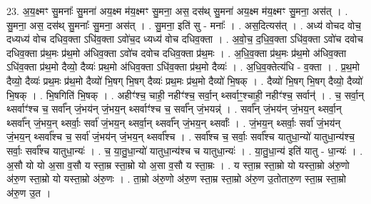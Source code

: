 \documentclass[17pt]{extarticle}
\begin{document}
23. अ॒य॒क्ष्मꣳ सु॒मनाः᳚ सु॒मना॑ अय॒क्ष्म म॑य॒क्ष्मꣳ सु॒मना॒ अस॒ दस॑थ् सु॒मना॑ अय॒क्ष्म म॑य॒क्ष्मꣳ सु॒मना॒ अस॑त् । . सु॒मना॒ अस॒ दस॑थ् सु॒मनाः᳚ सु॒मना॒ अस॑त् । . सु॒मना॒ इति॑ सु - मनाः᳚ । . अस॒दित्यस॑त् । . अध्य॑ वोचद वोच॒ दध्यध्य॑ वोच दधिव॒क्ता ऽधि॑व॒क्ता ऽवो॑च॒द ध्यध्य॑ वोच दधिव॒क्ता । . अ॒वो॒च॒ द॒धि॒व॒क्ता ऽधि॑व॒क्ता ऽवो॑च दवोच दधिव॒क्ता प्र॑थ॒मः प्र॑थ॒मो अ॑धिव॒क्ता ऽवो॑च दवोच दधिव॒क्ता प्र॑थ॒मः । . अ॒धि॒व॒क्ता प्र॑थ॒मः प्र॑थ॒मो अ॑धिव॒क्ता ऽधि॑व॒क्ता प्र॑थ॒मो दैव्यो॒ दैव्यः॑ प्रथ॒मो अ॑धिव॒क्ता ऽधि॑व॒क्ता प्र॑थ॒मो दैव्यः॑ । . अ॒धि॒व॒क्तेत्य॑धि - व॒क्ता । . प्र॒थ॒मो दैव्यो॒ दैव्यः॑ प्रथ॒मः प्र॑थ॒मो दैव्यो॑ भि॒षग् भि॒षग् दैव्यः॑ प्रथ॒मः प्र॑थ॒मो दैव्यो॑ भि॒षक् । . दैव्यो॑ भि॒षग् भि॒षग् दैव्यो॒ दैव्यो॑ भि॒षक् । . भि॒षगिति॑ भि॒षक् । . अहीꣳ॑श्च॒ चाही॒ नहीꣳ॑श्च॒ सर्वा॒न् थ्सर्वाꣳ॒॒श्चाही॒ नहीꣳ॑श्च॒ सर्वान्॑ । . च॒ सर्वा॒न् थ्सर्वाꣳ॑श्च च॒ सर्वा᳚न् जं॒भय॑न् जं॒भय॒न् थ्सर्वाꣳ॑श्च च॒ सर्वा᳚न् जं॒भयन्न्॑ । . सर्वा᳚न् जं॒भय॑न् जं॒भय॒न् थ्सर्वा॒न् थ्सर्वा᳚न् जं॒भय॒न् थ्सर्वाः॒ सर्वा॑ जं॒भय॒न् थ्सर्वा॒न् थ्सर्वा᳚न् जं॒भय॒न् थ्सर्वाः᳚ । . जं॒भय॒न् थ्सर्वाः॒ सर्वा॑ जं॒भय॑न् जं॒भय॒न् थ्सर्वा᳚श्च च॒ सर्वा॑ जं॒भय॑न् जं॒भय॒न् थ्सर्वा᳚श्च । . सर्वा᳚श्च च॒ सर्वाः॒ सर्वा᳚श्च यातुधा॒न्यो॑ यातुधा॒न्य॑श्च॒ सर्वाः॒ सर्वा᳚श्च यातुधा॒न्यः॑ । . च॒ या॒तु॒धा॒न्यो॑ यातुधा॒न्य॑श्च च यातुधा॒न्यः॑ । . या॒तु॒धा॒न्य॑ इति॑ यातु - धा॒न्यः॑ । . अ॒सौ यो यो अ॒सा व॒सौ य स्ता॒म्र स्ता॒म्रो यो अ॒सा व॒सौ य स्ता॒म्रः । . य स्ता॒म्र स्ता॒म्रो यो यस्ता॒म्रो अ॑रु॒णो अ॑रु॒ण स्ता॒म्रो यो यस्ता॒म्रो अ॑रु॒णः । . ता॒म्रो अ॑रु॒णो अ॑रु॒ण स्ता॒म्र स्ता॒म्रो अ॑रु॒ण उ॒तोतारु॒ण स्ता॒म्र स्ता॒म्रो अ॑रु॒ण उ॒त । \newline
\end{document}
